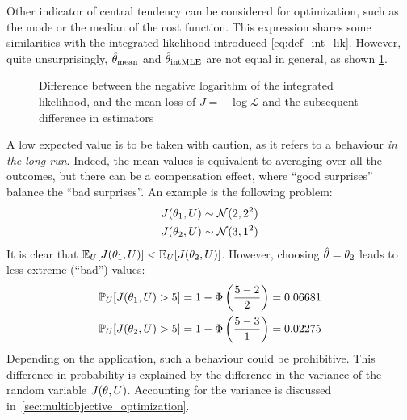 \documentclass[../../Main_ManuscritThese.tex]{subfiles}
\newcommand\imgpath{/home/victor/acadwriting/Manuscrit/Text/Chapter3/img/}
\begin{document}
Other indicator of central tendency can be considered for optimization, such as the mode or the median of the cost function. 
This expression shares some similarities with the integrated likelihood introduced \cref{eq:def_int_lik}. However, quite unsurprisingly, $\hat{\theta}_{\mathrm{mean}}$ and $\hat{\theta}_{\mathrm{intMLE}}$ are not equal in general, as shown \cref{fig:difference_arithmetic_geometric_mean}.
\begin{figure}[ht]
  \centering
  
  \caption{\label{fig:difference_arithmetic_geometric_mean} Difference between the negative logarithm of the integrated likelihood, and the mean loss of $J = -\log \mathcal{L}$ and the subsequent difference in estimators}
\end{figure}



A low expected value is to be taken with caution, as it refers to a behaviour \emph{in the long run}. Indeed, the mean values is equivalent to averaging over all the outcomes, but there can be a compensation effect, where ``good surprises'' balance the ``bad surprises''.
An example is the following problem:
\begin{align}
  J(\theta_1, U) &\sim \mathcal{N}(2, 2^2) \\
  J(\theta_2, U) & \sim \mathcal{N}(3, 1^2)
\end{align}
It is clear that $\mathbb{E}_{U}[J(\theta_1, U)] < \mathbb{E}_{U}[J(\theta_2, U)]$. However, choosing $\hat{\theta}_{\mathrm{}} = \theta_2$ leads to less extreme (``bad'') values:
\begin{align}
  \mathbb{P}_{U}[J(\theta_1, U) > 5] = 1 - \Phi\left(\frac{5-2}{2}\right) = 0.06681 \\
  \mathbb{P}_{U}[J(\theta_2, U) > 5] = 1 - \Phi\left(\frac{5-3}{1}\right) = 0.02275 \\
\end{align}
Depending on the application, such a behaviour could be prohibitive.
This difference in probability is explained by the difference in the variance of the random variable $J(\theta, U)$.
Accounting for the variance is discussed in~\cref{sec:multiobjective_optimization}.
\end{document}
